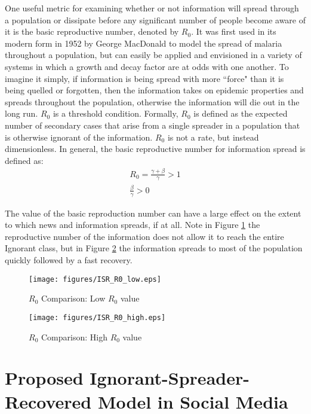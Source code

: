 One useful metric for examining whether or not information will spread through a population or dissipate before any significant number of people become aware of it is the basic reproductive number, denoted by $R_0$. It was first used in its modern form in 1952 by George MacDonald to model the spread of malaria throughout a population, but can easily be applied and envisioned in a variety of systems in which a growth and decay factor are at odds with one another. To imagine it simply, if information is being spread with more ``force" than it is being quelled or forgotten, then the information takes on epidemic properties and spreads throughout the population, otherwise the information will die out in the long run. $R_0$ is a threshold condition.
Formally, $R_0$ is defined as the expected number of secondary cases that arise from a single spreader in a population that is otherwise ignorant of the information. $R_0$ is not a rate, but instead dimensionless. 
\noindent In general, the basic reproductive number for information spread is defined as:\\
\begin{equation}\label{eqn:reproductive_number}
\left.\begin{aligned}
R_0 = \frac{\gamma + \beta}{\gamma} > 1 \\
\frac{\beta }{\gamma } > 0
\end{aligned}\right.
\end{equation}

\noindent The value of the basic reproduction number can have a large effect on the extent to which news and information spreads, if at all. Note in Figure \ref{fig:IRC_R0_low} the reproductive number of the information does not allow it to reach the entire Ignorant class, but in Figure \ref{fig:IRC_R0_high} the information spreads to most of the population quickly followed by a fast recovery. 

\begin{figure}[!htbp] \centering
  \texttt{[image: figures/ISR\_R0\_low.eps]}
  \caption{$R_0$ Comparison: Low $R_0$ value}
  \label{fig:IRC_R0_low}
\end{figure}

\begin{figure}[!htbp] \centering
  \texttt{[image: figures/ISR\_R0\_high.eps]}
  \caption{$R_0$ Comparison: High $R_0$ value}
  \label{fig:IRC_R0_high}
\end{figure}

\section{Proposed Ignorant-Spreader-Recovered Model in Social Media}

